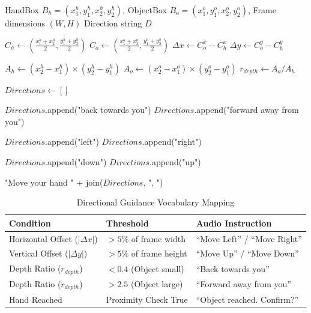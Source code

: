 \documentclass[12pt,a4paper]{report}
\begin{document}
\begin{algorithm}[H]
\caption{Generate Directional Guidance}
\begin{algorithmic}[1]
\Require HandBox $B_h = (x_1^h, y_1^h, x_2^h, y_2^h)$, ObjectBox $B_o = (x_1^o, y_1^o, x_2^o, y_2^o)$, Frame dimensions $(W, H)$
\Ensure Direction string $D$

\State $C_h \gets \left(\frac{x_1^h + x_2^h}{2}, \frac{y_1^h + y_2^h}{2}\right)$ 
\State $C_o \gets \left(\frac{x_1^o + x_2^o}{2}, \frac{y_1^o + y_2^o}{2}\right)$ 
\State $\Delta x \gets C_o^x - C_h^x$ 
\State $\Delta y \gets C_o^y - C_h^y$ 

\State $A_h \gets (x_2^h - x_1^h) \times (y_2^h - y_1^h)$ 
\State $A_o \gets (x_2^o - x_1^o) \times (y_2^o - y_1^o)$ 
\State $r_{depth} \gets A_o / A_h$ 

\State $Directions \gets []$

 
    \State $Directions$.append("back towards you")
 
    \State $Directions$.append("forward away from you")
\EndIf

 
        \State $Directions$.append("left") 
    \Else
        \State $Directions$.append("right")
    \EndIf
\EndIf

        \State $Directions$.append("down")
    \Else
        \State $Directions$.append("up")
    \EndIf
\EndIf

\State \Return "Move your hand " + join($Directions$, ", ")
\end{algorithmic}
\end{algorithm}

\begin{table}[H]
\centering
\caption{Directional Guidance Vocabulary Mapping}
\label{tab:guidance_vocab}
\begin{tabular}{@{}lll@{}}
\toprule
\textbf{Condition} & \textbf{Threshold} & \textbf{Audio Instruction} \\ \midrule
Horizontal Offset ($|\Delta x|$) & $> 5\%$ of frame width & ``Move Left'' / ``Move Right'' \\
Vertical Offset ($|\Delta y|$) & $> 5\%$ of frame height & ``Move Up'' / ``Move Down'' \\
Depth Ratio ($r_{depth}$) & $< 0.4$ (Object small) & ``Back towards you'' \\
Depth Ratio ($r_{depth}$) & $> 2.5$ (Object large) & ``Forward away from you'' \\
Hand Reached & Proximity Check True & ``Object reached. Confirm?'' \\ \bottomrule
\end{tabular}
\end{table}
\end{document}
